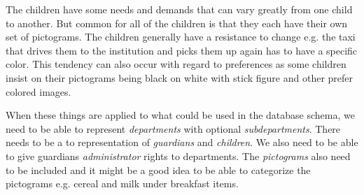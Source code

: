 The children have some needs and demands that can vary greatly from one child to another. But common for all of the children is that they each have their own set of pictograms. The children generally have a resistance to change e.g. the taxi that drives them to the institution and picks them up again has to have a specific color. This tendency can also occur with regard to preferences as some children insist on their pictograms being black on white with stick figure and other prefer colored images. 

When these things are applied to what could be used in the database schema, we need to be able to represent \emph{departments} with optional \emph{subdepartments}. There needs to be a to representation of \emph{guardians} and \emph{children}. We also need to be able to give guardians \emph{administrator} rights to departments. The \emph{pictograms} also need to be included and it might be a good idea to be able to categorize the pictograms e.g. cereal and milk under breakfast items.




